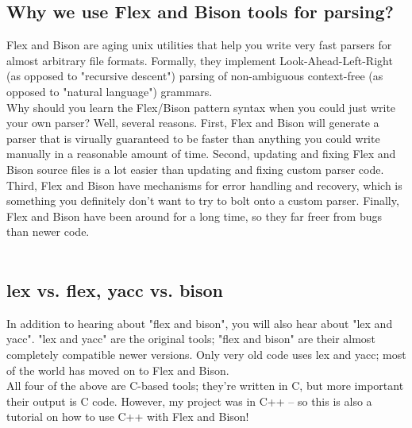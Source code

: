 \subsection{Why we use Flex and Bison tools for parsing?}

Flex and Bison are aging unix utilities that help you write very fast parsers for almost arbitrary file formats. Formally, they implement Look-Ahead-Left-Right (as opposed to "recursive descent") parsing of non-ambiguous context-free (as opposed to "natural language") grammars.\\
Why should you learn the Flex/Bison pattern syntax when you could just write your own parser? Well, several reasons. First, Flex and Bison will generate a parser that is virually guaranteed to be faster than anything you could write manually in a reasonable amount of time. Second, updating and fixing Flex and Bison source files is a lot easier than updating and fixing custom parser code. Third, Flex and Bison have mechanisms for error handling and recovery, which is something you definitely don't want to try to bolt onto a custom parser. Finally, Flex and Bison have been around for a long time, so they far freer from bugs than newer code.\\\\

\subsection{lex vs. flex, yacc vs. bison}
In addition to hearing about "flex and bison", you will also hear about "lex and yacc". "lex and yacc" are the original tools; "flex and bison" are their almost completely compatible newer versions. Only very old code uses lex and yacc; most of the world has moved on to Flex and Bison.\\
All four of the above are C-based tools; they're written in C, but more important their output is C code. However, my project was in C++ -- so this is also a tutorial on how to use C++ with Flex and Bison! \\\\

